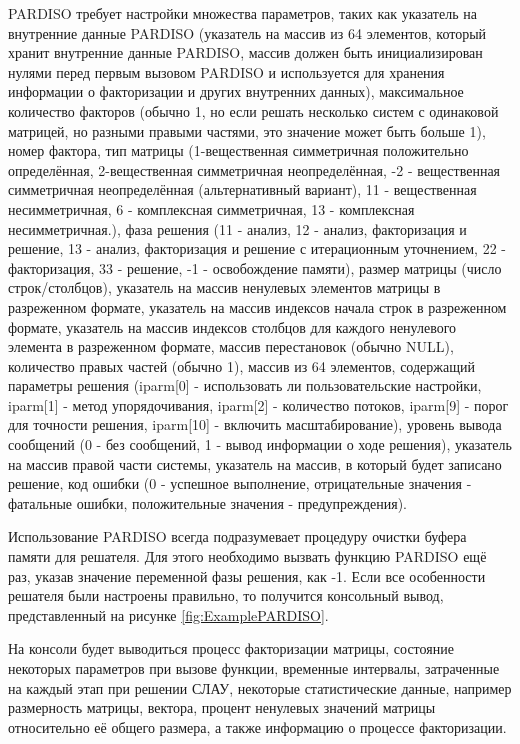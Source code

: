PARDISO требует настройки множества параметров, таких как указатель на внутренние данные PARDISO (указатель на массив из 64 элементов, который хранит внутренние данные PARDISO, массив должен быть инициализирован нулями перед первым вызовом PARDISO и используется для хранения информации о факторизации и других внутренних данных), максимальное количество факторов (обычно 1, но если решать несколько систем с одинаковой матрицей, но разными правыми частями, это значение может быть больше 1), номер фактора, тип матрицы (1-вещественная симметричная положительно определённая, 2-вещественная симметричная неопределённая, -2 - вещественная симметричная неопределённая (альтернативный вариант), 11 - вещественная несимметричная, 6 - комплексная симметричная, 13 - комплексная несимметричная.), фаза решения (11 - анализ, 12 - анализ, факторизация и решение, 13 - анализ, факторизация и решение с итерационным уточнением, 22 - факторизация, 33 - решение, -1 - освобождение памяти), размер матрицы (число строк/столбцов), указатель на массив ненулевых элементов матрицы в разреженном формате, указатель на массив индексов начала строк в разреженном формате, указатель на массив индексов столбцов для каждого ненулевого элемента в разреженном формате, массив перестановок (обычно NULL), количество правых частей (обычно 1), массив из 64 элементов, содержащий параметры решения (iparm[0] - использовать ли пользовательские настройки, iparm[1] - метод упорядочивания, iparm[2] - количество потоков, iparm[9] - порог для точности решения, iparm[10] - включить масштабирование), уровень вывода сообщений (0 - без сообщений, 1 - вывод информации о ходе решения), указатель на массив правой части системы, указатель на массив, в который будет записано решение, код ошибки (0 - успешное выполнение, отрицательные значения - фатальные ошибки, положительные значения - предупреждения).

Использование PARDISO всегда подразумевает процедуру очистки буфера памяти для решателя. Для этого необходимо вызвать функцию PARDISO ещё раз, указав значение переменной фазы решения, как -1. Если все особенности решателя были настроены правильно, то получится консольный вывод, представленный на рисунке \ref{fig:ExamplePARDISO}.

На консоли будет выводиться процесс факторизации матрицы, состояние некоторых параметров при вызове функции, временные интервалы, затраченные на каждый этап при решении СЛАУ, некоторые статистические данные, например размерность матрицы, вектора, процент ненулевых значений матрицы относительно её общего размера, а также информацию о процессе факторизации.

